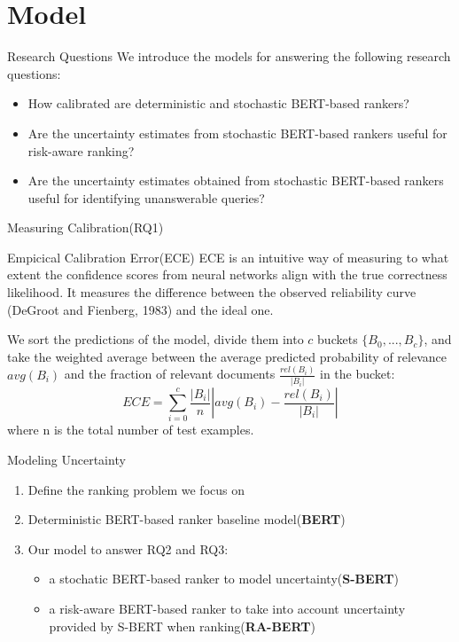 \documentclass{beamer}
\begin{document}
\section{Model}
\begin{frame}{Research Questions}
We introduce the models for answering the following research questions:
\begin{itemize}
    \item [RQ1] How calibrated are deterministic and stochastic BERT-based rankers?
    \item [RQ2] Are the uncertainty estimates from stochastic BERT-based rankers useful for risk-aware ranking?
    \item [RQ3] Are the uncertainty estimates obtained from stochastic BERT-based rankers useful for identifying unanswerable queries?
\end{itemize}
\end{frame}

\begin{frame}{Measuring Calibration(RQ1)}
\begin{block}{Empicical Calibration Error(ECE)}
ECE is an intuitive way of measuring to what extent the confidence scores
from neural networks align with the true correctness likelihood. It measures the difference between the observed reliability curve (DeGroot and Fienberg, 1983) and the ideal one.
\end{block}
We sort the predictions of the model, divide them into $c$ buckets $\{B_0, ..., B_c\}$, and take the weighted average
between the average predicted probability
of relevance $avg(B_i)$ and the fraction of relevant
documents $\frac{rel(B_i)}{|B_i|}$ in the bucket:
\begin{equation}
    ECE = \sum_{i=0}^c \frac{|B_i|}{n} \left|avg(B_i) - \frac{rel(B_i)}{|B_i|} \right|
\end{equation}
where n is the total number of test examples.
\end{frame}

\begin{frame}{Modeling Uncertainty}
\begin{enumerate}
    \item Define the ranking problem we focus on
    \item Deterministic BERT-based ranker baseline model(\textbf{BERT})
    \item Our model to answer RQ2 and RQ3:
        \begin{itemize}
            \item a stochatic BERT-based ranker to model uncertainty(\textbf{S-BERT})
            \item a risk-aware BERT-based ranker to take into account uncertainty provided by S-BERT when ranking(\textbf{RA-BERT})
        \end{itemize}
\end{enumerate}
\end{frame}
\end{document}

